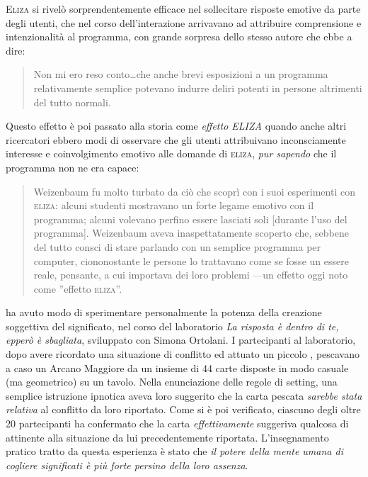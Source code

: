 \noindent \textsc{Eliza} si rivelò sorprendentemente efficace nel sollecitare risposte emotive da parte degli utenti, che nel corso dell'interazione arrivavano ad attribuire comprensione e intenzionalità al programma, con grande sorpresa dello stesso autore che ebbe a dire\cite{weizenbaum}:

\begin{quote}
Non mi ero reso conto\ldots che anche brevi esposizioni a un programma relativamente semplice potevano indurre deliri potenti in persone altrimenti del tutto normali.
\end{quote}

\noindent Questo effetto è poi passato alla storia come \emph{effetto ELIZA}  quando anche altri ricercatori ebbero modi di osservare che gli utenti attribuivano inconsciamente interesse e coinvolgimento emotivo alle domande di \textsc{eliza}, \emph{pur sapendo} che il programma non ne era capace\cite{billings}:

\begin{quote}
Weizenbaum fu molto turbato da ciò che scoprì con i suoi esperimenti con \textsc{eliza}: alcuni studenti mostravano un forte legame emotivo con il programma; alcuni volevano perfino essere lasciati soli [durante l'uso del programma]. Weizenbaum aveva inaspettatamente scoperto che, sebbene del tutto consci di stare parlando con un semplice programma per computer, ciononostante le persone lo trattavano come se fosse un essere reale, pensante, a cui importava dei loro problemi ---un effetto oggi noto come ''effetto \textsc{eliza}''.
\end{quote}

 ha avuto modo di sperimentare personalmente la potenza della creazione soggettiva del significato, nel corso del laboratorio%
 \emph{La risposta è dentro di te, epperò è sbagliata}, sviluppato con Simona Ortolani.
I partecipanti al laboratorio, dopo avere ricordato una situazione di conflitto ed attuato un piccolo , pescavano a caso un Arcano Maggiore da un insieme di 44 carte disposte in modo casuale (ma geometrico) su un tavolo. Nella enunciazione delle regole di setting, una semplice istruzione ipnotica%
 aveva loro suggerito che la carta pescata \emph{sarebbe stata relativa} al conflitto da loro riportato. Come si è poi verificato, ciascuno degli oltre 20 partecipanti ha confermato che la carta \emph{effettivamente} suggeriva qualcosa di attinente alla situazione da lui precedentemente riportata.
L'insegnamento pratico tratto da questa esperienza è stato che \emph{il potere della mente umana di cogliere significati è più forte persino della loro assenza}.

